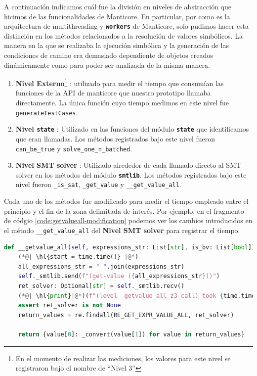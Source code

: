 A continuación indicamos cuál fue la división en niveles de abstracción que hicimos de las funcionalidades de Manticore.
En particular, por como es la arquitectura de multithreading y \textbf{\texttt{workers}} de Manticore, solo pudimos hacer esta distinción en los métodos relacionados a la resolución de valores simbólicos.
La manera en la que se realizaba la ejecución simbólica y la generación de las condiciones de camino era demasiado dependiente de objetos creados dinámicamente como para poder ser analizada de la misma manera.
\begin{enumerate}
    \item \textbf{Nivel Externo}\footnote{En el momento de realizar las mediciones, los valores para este nivel se registraron bajo el nombre de  ``Nivel 3''} : utilizado para medir el tiempo que consumían las funciones de la API de manticore que nuestro prototipo llamaba directamente.
          La única función cuyo tiempo medimos en este nivel fue \texttt{generateTestCases}.
    \item \textbf{Nivel \texttt{state}} : Utilizado en las funciones del módulo \textbf{\texttt{state}} que identificamos que eran llamadas.
          Los métodos registrados bajo este nivel fueron \texttt{can\_be\_true} y \texttt{solve\_\allowbreak one\_\allowbreak n\_\allowbreak batched}.
    \item \textbf{Nivel SMT solver} : Utilizado alrededor de cada llamado directo al SMT solver en los métodos del módulo \textbf{\texttt{smtlib}}.
          Los métodos registrados bajo este nivel fueron \texttt{\_is\_sat}, \texttt{\_get\_value} y \texttt{\_\_get\_value\_all}.
\end{enumerate}
Cada uno de los métodos fue modificado para medir el tiempo empleado entre el principio y el fin de la zona delimitada de interés.
Por ejemplo, en el fragmento de códgio \ref{code:getvalueall-modification} podemos ver los cambios introducidos en el método \texttt{\_\_get\_value\_all} del \textbf{Nivel SMT solver} para registrar el tiempo.

\begin{lstlisting}[language=Python,
    label={code:getvalueall-modification},
    caption={Método \texttt{\_\_get\_value\_all} del modulo \textbf{\texttt{smtlib}} modificado para registrar el tiempo empleado por la llamada al SMT solver.
    El código resaltado indica las líneas agregadas para registrar el tiempo.},
    captionpos=b]
def __getvalue_all(self, expressions_str: List[str], is_bv: List[bool]) -> Dict[str, int]:
    (*@| \hl{start = time.time()} |@*)
    all_expressions_str = " ".join(expressions_str)
    self._smtlib.send(f"(get-value ({all_expressions_str}))")
    ret_solver: Optional[str] = self._smtlib.recv()
    (*@| \hl{print}|@*)(f"(level _getvalue_all_z3_call) took {time.time()- start} seconds")
    assert ret_solver is not None
    return_values = re.findall(RE_GET_EXPR_VALUE_ALL, ret_solver)
    
    return {value[0]: _convert(value[1]) for value in return_values}
\end{lstlisting}


